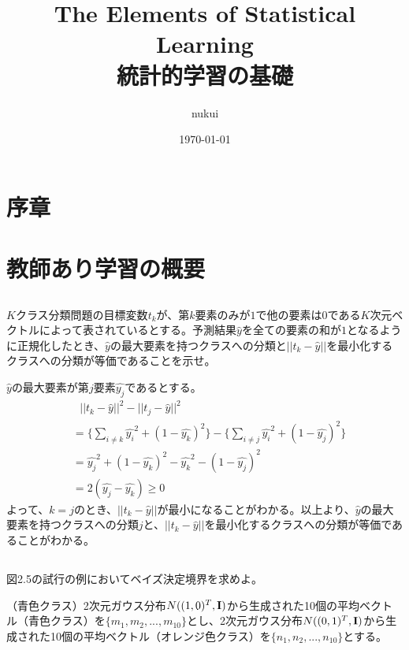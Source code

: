 \documentclass{jsarticle}
\begin{document}
\title{The Elements of Statistical Learning\\統計的学習の基礎}
\author{nukui}
\date{\today}
\maketitle



\section{序章}
\section{教師あり学習の概要}
\subsection{}
\begin{shadebox}
$K$クラス分類問題の目標変数$t_k$が、第$k$要素のみが$1$で他の要素は$0$である$K$次元ベクトルによって表されているとする。予測結果$\hat{y}$を全ての要素の和が$1$となるように正規化したとき、$\hat{y}$の最大要素を持つクラスへの分類と$||t_k-\hat{y}||$を最小化するクラスへの分類が等価であることを示せ。
\end{shadebox}
$\hat{y}$の最大要素が第$j$要素$\hat{y_j}$であるとする。
\begin{align*}
&\ \ \ ||t_k-\hat{y}||^2-||t_j-\hat{y}||^2\\
&=\{\sum_{i\neq k}\hat{y_i}^2+(1-\hat{y_k})^2\}-\{\sum_{i\neq j}\hat{y_i}^2+(1-\hat{y_j})^2\}\\
&=\hat{y_j}^2+(1-\hat{y_k})^2-\hat{y_k}^2-(1-\hat{y_j})^2\\
&=2(\hat{y_j}-\hat{y_k})\geq0
\end{align*}
よって、$k=j$のとき、$||t_k-\hat{y}||$が最小になることがわかる。以上より、$\hat{y}$の最大要素を持つクラスへの分類$j$と、$||t_k-\hat{y}||$を最小化するクラスへの分類が等価であることがわかる。


\subsection{}
\begin{shadebox}
図2.5の試行の例においてベイズ決定境界を求めよ。
\end{shadebox}
（青色クラス）2次元ガウス分布$N((1,0)^T,\bf{I})$から生成された10個の平均ベクトル（青色クラス）を$\{m_1,m_2,...,m_{10}\}$とし、2次元ガウス分布$N((0,1)^T,\bf{I})$から生成された10個の平均ベクトル（オレンジ色クラス）を$\{n_1,n_2,...,n_{10}\}$とする。
\end{document}
